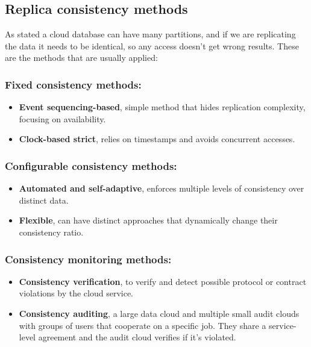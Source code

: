 \documentclass[14pt,oneside]{extreport}
\newcommand*\fpar{\hspace{1ex}}
\begin{document}
    \subsection{Replica consistency methods}
    \fpar As stated a cloud database can have many partitions, and if we are replicating the data it needs to be identical, so any access doesn't get wrong results. These are the methods that are usually applied:
      \subsubsection{Fixed consistency methods:}
      \begin{itemize}[noitemsep]
        \item \textbf{Event sequencing-based}, simple method that hides replication complexity, focusing on availability.
        \item \textbf{Clock-based strict}, relies on timestamps and avoids concurrent accesses.
      \end{itemize} 
      \vspace{-2em}
      \subsubsection{Configurable consistency methods:}
      \begin{itemize}[noitemsep]
        \item \textbf{Automated and self-adaptive}, enforces multiple levels of consistency over distinct data.
        \item \textbf{Flexible}, can have distinct approaches that dynamically change their consistency ratio.
      \end{itemize} 
      \vspace{-2em}
      \subsubsection{Consistency monitoring methods:}
      \begin{itemize}[noitemsep]
        \item \textbf{Consistency verification}, to verify and detect possible protocol or contract violations by the cloud service.
        \item \textbf{Consistency auditing}, a large data cloud and multiple small audit clouds with groups of users that cooperate on a specific job. They share a service-level agreement and the audit cloud verifies if it's violated.
      \end{itemize} 
\end{document}
